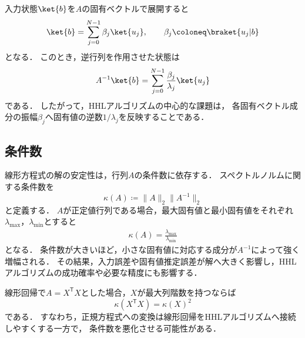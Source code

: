 入力状態$\ket{b}$を$A$の固有ベクトルで展開すると
\begin{equation}
  \ket{b}
  =
  \sum_{j=0}^{N-1}\beta_j\ket{u_j},
  \qquad
  \beta_j
  \coloneq
  \braket{u_j|b}
  \label{eq:b-eigenbasis-expansion}
\end{equation}
となる．
このとき，逆行列を作用させた状態は
\begin{equation}
  A^{-1}\ket{b}
  =
  \sum_{j=0}^{N-1}
  \frac{\beta_j}{\lambda_j}\ket{u_j}
  \label{eq:inverse-a-on-b}
\end{equation}
である．
したがって，HHLアルゴリズムの中心的な課題は，
各固有ベクトル成分の振幅$\beta_j$へ固有値の逆数$1/\lambda_j$を反映することである．

\subsection{条件数}
\label{subsec:condition-number}

線形方程式の解の安定性は，行列$A$の条件数に依存する．
スペクトルノルムに関する条件数を
\begin{equation}
  \kappa(A)
  \coloneq
  \|A\|_2\|A^{-1}\|_2
  \label{eq:condition-number-definition}
\end{equation}
と定義する．
$A$が正定値行列である場合，最大固有値と最小固有値をそれぞれ
$\lambda_{\max}$，$\lambda_{\min}$とすると
\begin{align*}
  \kappa(A)
  =
  \frac{\lambda_{\max}}{\lambda_{\min}}
\end{align*}
となる．
条件数が大きいほど，小さな固有値に対応する成分が$A^{-1}$によって強く増幅される．
その結果，入力誤差や固有値推定誤差が解へ大きく影響し，HHLアルゴリズムの成功確率や必要な精度にも影響する．

線形回帰で$A=X^{\mathsf{T}}X$とした場合，$X$が最大列階数を持つならば
\begin{equation}
  \kappa(X^{\mathsf{T}}X)
  =
  \kappa(X)^2
  \label{eq:normal-equation-condition-number}
\end{equation}
である．
すなわち，正規方程式への変換は線形回帰をHHLアルゴリズムへ接続しやすくする一方で，
条件数を悪化させる可能性がある．

